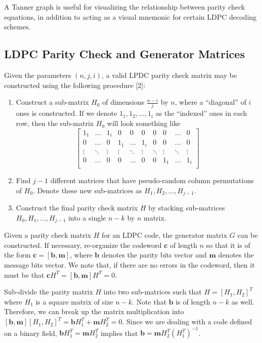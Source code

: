 \documentclass[conference]{IEEEtran}
\begin{document}
A Tanner graph is useful for visualizing the relationship between parity check equations, in addition to acting as a visual mnemonic for certain LDPC decoding schemes.

\subsection{LDPC Parity Check and Generator Matrices}\label{matrices}
Given the parameters $(n,j,i)$, a valid LPDC parity check matrix may be constructed using the following procedure [2]:
\begin{enumerate}
  \item Construct a sub-matrix $H_0$ of dimensions $\frac{n-i}{j}$ by $n$, where a ``diagonal'' of $i$ ones is constructed.
    If we denote $1_1, 1_2, \ldots, 1_i$ as the ``indexed'' ones in each row, then the sub-matrix $H_0$ will look something like
    $$\begin{bmatrix}
      1_1   &\ldots& 1_i  & 0    & 0    & 0    & 0    &0     &\ldots& 0\\
      0     &\ldots& 0    & 1_1  &\ldots& 1_i  & 0    &0     &\ldots& 0\\
      \vdots&\ddots&\vdots&\vdots&\ddots&\vdots&\ddots&\vdots&\ddots&\vdots \\
      0     &\ldots& 0    & 0    &\ldots& 0    & 0    & 1_1  &\ldots& 1_i \\
    \end{bmatrix}$$
  \item Find $j - 1$ different matrices that have pseudo-random column permutations of $H_0$. Denote these new sub-matrices as $H_1, H_2, \ldots, H_{j-1}$.
  \item Construct the final parity check matrix $H$ by stacking sub-matrices $H_0,H_1,\ldots,H_{j-1}$ into a single $n-k$ by $n$ matrix.
\end{enumerate}

Given a parity check matrix $H$ for an LDPC code, the generator matrix $G$ can
be constructed.
If necessary, re-organize the codeword $\textbf{c}$ of length $n$ so that it is of the form $\textbf{c} = [\textbf{b}, \textbf{m}]$, where $\textbf{b}$ denotes the parity bits vector and $\textbf{m}$ denotes the message bits vector.
    We note that, if there are no errors in the codeword, then it must be that $\textbf{c}H^T = [\textbf{b}, \textbf{m}]H^T = 0$.

Sub-divide the parity matrix $H$ into two sub-matrices such that $H = [H_1, H_2]^T$ where $H_1$ is a square matrix of size $n-k$.
    Note that $\textbf{b}$ is of length $n-k$ as well.
    Therefore, we can break up the matrix
    multiplication into $[\textbf{b}, \textbf{m}][H_1, H_2]^T = \textbf{b}H_1^T + \textbf{m}H_2^T = 0$.
Since we are dealing with a code defined on a binary field, $\textbf{b}H_1^T = \textbf{m}H_2^T$ implies that $\textbf{b}= \textbf{m}H_2^T(H_1^T)^{-1}$.
\end{document}
